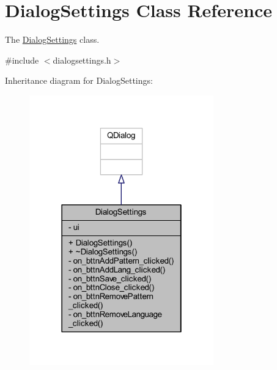 \hypertarget{class_dialog_settings}{\section{Dialog\+Settings Class Reference}
\label{class_dialog_settings}
}


The \hyperlink{class_dialog_settings}{Dialog\+Settings} class.  




{\ttfamily \#include $<$dialogsettings.\+h$>$}



Inheritance diagram for Dialog\+Settings\+:
\nopagebreak
\begin{figure}[H]
\begin{center}
\leavevmode
\includegraphics[width=226pt]{class_dialog_settings__inherit__graph}
\end{center}
\end{figure}


